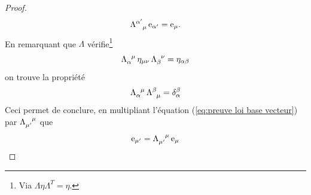 {\begin{proof}
    \begin{equation}
        \label{eq:preuve loi base vecteur}
        \Lambda\indices{^{\alpha'}_{\mu}} \,\mathrm{e}_{\alpha'} = \mathrm{e}_{\mu}.
    \end{equation}
    En remarquant que $\Lambda$ vérifie\footnote{Via $\Lambda \eta \Lambda^T = \eta$.}
    \begin{equation}
    \nonumber\Lambda\indices{_{\alpha}^\mu}\, \eta_{\mu\nu} \,\Lambda\indices{_{\beta}^\nu} = \eta_{\alpha\beta}
    \end{equation}
    on trouve la propriété
    \begin{equation}
        \label{eq:id lambda}
        \Lambda\indices{_{\alpha}^\mu} \, \Lambda\indices{^\beta_\mu} = \delta^\beta_{\alpha}
    \end{equation}
    Ceci permet de conclure, en multipliant l'équation (\ref{eq:preuve loi base vecteur}) par $\Lambda\indices{_{\mu'}^{\mu}}$ que
    \begin{equation}
    \nonumber
        \mathrm{e}_{\mu'} = \Lambda\indices{_{\mu'}^{\mu}}\, \mathrm{e}_{\mu}
    \end{equation}
\end{proof}

}

